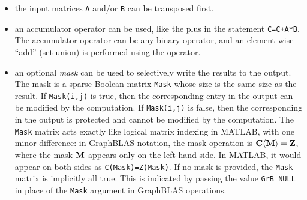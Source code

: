 \documentclass[12pt]{article}
\begin{document}
\begin{itemize}
\item the input matrices \verb'A' and/or \verb'B' can be transposed first.

\item an accumulator operator can be used, like the plus in the statement
    \verb'C=C+A*B'.  The accumulator operator can be any binary operator, and
    an element-wise ``add'' (set union) is performed using the operator.

\item an optional {\em mask} can be used to selectively write the results to
    the output.  The mask is a sparse Boolean matrix \verb'Mask' whose size is
    the same size as the result.  If \verb'Mask(i,j)' is true, then the
    corresponding entry in the output can be modified by the computation.  If
    \verb'Mask(i,j)' is false, then the corresponding in the output is
    protected and cannot be modified by the computation.  The \verb'Mask'
    matrix acts exactly like logical matrix indexing in MATLAB, with one
    minor difference: in GraphBLAS notation, the mask operation is $\bf C
    \langle M \rangle = Z$, where the mask $\bf M$ appears only on the
    left-hand side.  In MATLAB, it would appear on both sides as
    \verb'C(Mask)=Z(Mask)'.  If no mask is provided, the \verb'Mask' matrix is
    implicitly all true.  This is indicated by passing the value
    \verb'GrB_NULL' in place of the \verb'Mask' argument in GraphBLAS
    operations.

\end{itemize}
\end{document}
